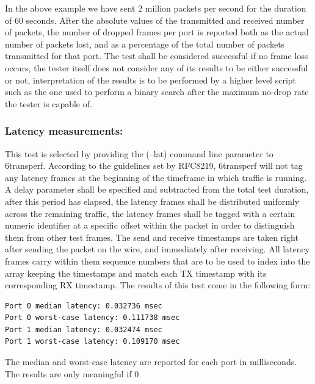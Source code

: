 \documentclass[a4paper,12p]{article}
\begin{document}
In the above example we have sent 2 million packets per second for the duration of 60 seconds. After the absolute values of the transmitted and received number of packets, the number of dropped frames per port is reported both as the actual number of packets lost, and as a percentage of the total number of packets transmitted for that port.
The test shall be considered successful if no frame loss occurs, the tester itself does not consider any of its results to be either successful or not, interpretation of the results is to be performed by a higher level script such as the one used to perform a binary search after the maximum no-drop rate the tester is capable of.

\subsubsection{Latency measurements:}

This test is selected by providing the (--lat) command line parameter to 6transperf. According to the guidelines set by RFC8219, 6transperf will not tag any latency frames at the beginning of the timeframe in which traffic is running. A delay parameter shall be specified and subtracted from the total test duration, after this period has elapsed, the latency frames shall be distributed uniformly across the remaining traffic, the latency frames shall be tagged with a certain numeric identifier at a specific offset within the packet in order to distinguish them from other test frames. The send and receive timestamps are taken right after sending the packet on the wire, and immediately after receiving. All latency frames carry within them sequence numbers that are to be used to index into the array keeping the timestamps and match each TX timestamp with its corresponding RX timestamp. The results of this test come in the following form:

\begin{lstlisting}
Port 0 median latency: 0.032736 msec
Port 0 worst-case latency: 0.111738 msec
Port 1 median latency: 0.032474 msec
Port 1 worst-case latency: 0.109170 msec
\end{lstlisting}

The median and worst-case latency are reported for each port in milliseconds. The results are only meaningful if 0%
\end{document}
